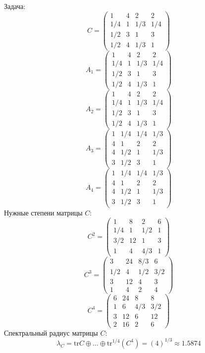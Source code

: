 Задача:
$$C= \begin{pmatrix}
1 & 4 & 2 & 2\\
1/4 & 1 & 1/3 & 1/4\\
1/2 & 3 & 1 & 3\\
1/2 & 4 & 1/3 & 1
\end{pmatrix}
$$
$$A_1= \begin{pmatrix}
1 & 4 & 2 & 2\\
1/4 & 1 & 1/3 & 1/4\\
1/2 & 3 & 1 & 3\\
1/2 & 4 & 1/3 & 1
\end{pmatrix}
$$
$$A_2= \begin{pmatrix}
1 & 4 & 2 & 2\\
1/4 & 1 & 1/3 & 1/4\\
1/2 & 3 & 1 & 3\\
1/2 & 4 & 1/3 & 1
\end{pmatrix}
$$
$$A_3= \begin{pmatrix}
1 & 1/4 & 1/4 & 1/3\\
4 & 1 & 2 & 2\\
4 & 1/2 & 1 & 1/3\\
3 & 1/2 & 3 & 1
\end{pmatrix}
$$
$$A_4= \begin{pmatrix}
1 & 1/4 & 1/4 & 1/3\\
4 & 1 & 2 & 2\\
4 & 1/2 & 1 & 1/3\\
3 & 1/2 & 3 & 1
\end{pmatrix}
$$
Нужные степени матрицы $C$:
$$C^2 = \begin{pmatrix}
1 & 8 & 2 & 6\\
1/4 & 1 & 1/2 & 1\\
3/2 & 12 & 1 & 3\\
1 & 4 & 4/3 & 1
\end{pmatrix}
$$
$$C^3 = \begin{pmatrix}
3 & 24 & 8/3 & 6\\
1/2 & 4 & 1/2 & 3/2\\
3 & 12 & 4 & 3\\
1 & 4 & 2 & 4
\end{pmatrix}
$$
$$C^4 = \begin{pmatrix}
6 & 24 & 8 & 8\\
1 & 6 & 4/3 & 3/2\\
3 & 12 & 6 & 12\\
2 & 16 & 2 & 6
\end{pmatrix}
$$
Спектральный радиус матрицы $C$:
$$\lambda_{C} = \mathrm{tr}C\oplus \dots \oplus \mathrm{tr}^{1/4}(C^{4}) = (4)^{1/3} \approx 1.5874$$
